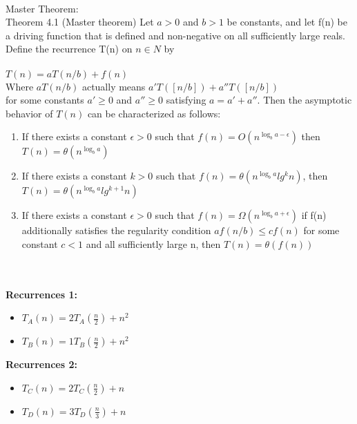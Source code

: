 \documentclass[a4paper]{exam}
\begin{document}
\begin{questions}
  \begin{solution}
  \\
  Master Theorem:\\
  Theorem 4.1 (Master theorem)
  Let $a > 0$ and $b > 1$ be constants, and let f(n) be a driving function that is
  defined and non-negative on all sufficiently large reals. Define the recurrence T(n) on $n \in N$ by\\
  \\
  $T(n) = aT(n/b) + f(n)$\\
  
  Where $aT(n/b)$ actually means $a'T([n/b])+a''T([n/b])$ 
  \\for some constants $a'\geq 0$ and $a''\geq 0$ satisfying $a=a'+a''$. Then the asymptotic behavior of $T(n)$ can be characterized as follows: 
  \begin{enumerate}
  \item If there exists a constant $\epsilon > 0$ such that $f(n)=O(n^{\log_{b}a - \epsilon})$ then $T(n)=\theta(n^{\log_{b} a})$
  \item If there exists a constant $k > 0$ such that $f(n)=\theta(n^{\log_{b} a} lg^k n)$, then $T(n)=\theta(n^{\log_{b} a} lg^{k+1} n)$
  \item If there exists a constant $\epsilon > 0$ such that $f(n)= \Omega (n^{\log_{b}a + \epsilon})$ if f(n) additionally satisfies the regularity condition $af(n/b) \leq cf(n)$ for some constant
  $c < 1$ and all sufficiently large n, then $T(n) =
  \theta(f(n))$ 
  \end{enumerate}
  
  \end{solution}
  
  
  \begin{solution}
  \\
  \\\textbf{Recurrences 1:}
  \begin{itemize}
  \item $T_A(n) = 2 T_A(\frac{n}{2}) + n^2$
  \item $T_B(n) = 1 T_B(\frac{n}{2}) + n^2$
  \end{itemize}

  \textbf{Recurrences 2:}
  \begin{itemize}
  \item $T_C(n) = 2T_C(\frac{n}{2}) + n$
  \item $T_D(n) = 3T_D(\frac{n}{3}) + n$
  \end{itemize}
  

\end{solution}
\end{questions}
\end{document}
